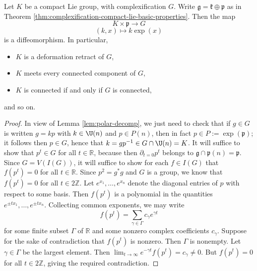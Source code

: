 \documentclass[reqno]{amsart} 
\begin{document}
\begin{theorem}
  Let $K$ be a compact Lie group, with complexification $G$.  Write $\mathfrak{g} = \mathfrak{k} \oplus \mathfrak{p}$ as in Theorem \ref{thm:complexification-compact-lie-basic-properties}.  Then the map
  \begin{equation*}
    K \times \mathfrak{p} \rightarrow G
  \end{equation*}
  \begin{equation*}
    (k,x) \mapsto k \exp(x)
  \end{equation*}
  is a diffeomorphism.  In particular,
  \begin{itemize}
  \item $K$ is a deformation retract of $G$,
  \item $K$ meets every connected component of $G$,
  \item $K$ is connected if and only if $G$ is connected,
  \end{itemize}
  and so on.
\end{theorem}
\begin{proof}
  In view of Lemma \ref{lem:polar-decomp}, we just need to check that if $g \in G$ is written $g = k p$ with $k \in \U(n)$ and $p \in P(n)$, then in fact $p \in P := \exp(\mathfrak{p})$; it follows then $p \in G$, hence that $k = g p^{-1} \in G \cap \U(n) = K$.  It will suffice to show that $p^t \in G$ for all $t \in \mathbb{R}$, because then $\partial_{t=0} p^t$ belongs to $\mathfrak{g} \cap \mathfrak{p}(n) = \mathfrak{p}$.  Since $G = V(I(G))$, it will suffice to show for each $f \in I(G)$ that $f(p^t) = 0$ for all $t \in \mathbb{R}$.  Since $p^2 = g^* g$ and $G$ is a group, we know that $f(p^{t}) = 0$ for all $t \in 2 \mathbb{Z}$.  Let $e^{x_1},\dotsc,e^{x_n}$ denote the diagonal entries of $p$ with respect to some basis.  Then $f(p^t)$ is a polynomial in the quantities $e^{\pm t x_1}, \dotsc, e^{\pm t x_n}$.  Collecting common exponents, we may write
  \begin{equation*}
    f(p^t) = \sum_{\gamma \in \Gamma} c_\gamma e^{\gamma t}
  \end{equation*}
  for some finite subset $\Gamma$ of $\mathbb{R}$ and some nonzero complex coefficients $c_\gamma$.  Suppose for the sake of contradiction that $f(p^t)$ is nonzero.  Then $\Gamma$ is nonempty.  Let $\gamma \in \Gamma$ be the largest element.  Then $\lim_{t \rightarrow \infty} e^{- \gamma t} f(p^t) = c_\gamma \neq 0$.  But $f(p^t) = 0$ for all $t \in 2 \mathbb{Z}$, giving the required contradiction.
\end{proof}
\end{document}
